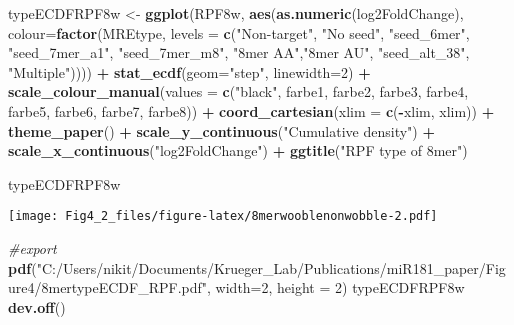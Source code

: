 \documentclass[
]{article}
\newenvironment{Shaded}{\begin{snugshade}}{\end{snugshade}}
\newcommand{\AttributeTok}[1]{\textcolor[rgb]{0.13,0.29,0.53}{#1}}
\newcommand{\CommentTok}[1]{\textcolor[rgb]{0.56,0.35,0.01}{\textit{#1}}}
\newcommand{\DecValTok}[1]{\textcolor[rgb]{0.00,0.00,0.81}{#1}}
\newcommand{\FunctionTok}[1]{\textcolor[rgb]{0.13,0.29,0.53}{\textbf{#1}}}
\newcommand{\NormalTok}[1]{#1}
\newcommand{\OtherTok}[1]{\textcolor[rgb]{0.56,0.35,0.01}{#1}}
\newcommand{\SpecialCharTok}[1]{\textcolor[rgb]{0.81,0.36,0.00}{\textbf{#1}}}
\newcommand{\StringTok}[1]{\textcolor[rgb]{0.31,0.60,0.02}{#1}}
\begin{document}
\begin{Shaded}
\begin{Highlighting}[]
\NormalTok{typeECDFRPF8w }\OtherTok{\textless{}{-}} \FunctionTok{ggplot}\NormalTok{(RPF8w, }\FunctionTok{aes}\NormalTok{(}\FunctionTok{as.numeric}\NormalTok{(log2FoldChange), }
                              \AttributeTok{colour=}\FunctionTok{factor}\NormalTok{(MREtype, }\AttributeTok{levels =} \FunctionTok{c}\NormalTok{(}\StringTok{"Non{-}target"}\NormalTok{, }\StringTok{"No seed"}\NormalTok{, }\StringTok{"seed\_6mer"}\NormalTok{, }\StringTok{"seed\_7mer\_a1"}\NormalTok{, }\StringTok{"seed\_7mer\_m8"}\NormalTok{, }\StringTok{"8mer AA"}\NormalTok{,}\StringTok{"8mer AU"}\NormalTok{, }\StringTok{"seed\_alt\_38"}\NormalTok{, }\StringTok{"Multiple"}\NormalTok{)))) }\SpecialCharTok{+} 
  \FunctionTok{stat\_ecdf}\NormalTok{(}\AttributeTok{geom=}\StringTok{"step"}\NormalTok{, }\AttributeTok{linewidth=}\DecValTok{2}\NormalTok{) }\SpecialCharTok{+}
  \FunctionTok{scale\_colour\_manual}\NormalTok{(}\AttributeTok{values =} \FunctionTok{c}\NormalTok{(}\StringTok{"black"}\NormalTok{, farbe1, farbe2, farbe3, farbe4, farbe5, farbe6, farbe7, farbe8)) }\SpecialCharTok{+}
  \FunctionTok{coord\_cartesian}\NormalTok{(}\AttributeTok{xlim =} \FunctionTok{c}\NormalTok{(}\SpecialCharTok{{-}}\NormalTok{xlim, xlim)) }\SpecialCharTok{+} 
  \FunctionTok{theme\_paper}\NormalTok{() }\SpecialCharTok{+}
  \FunctionTok{scale\_y\_continuous}\NormalTok{(}\StringTok{"Cumulative density"}\NormalTok{) }\SpecialCharTok{+} \FunctionTok{scale\_x\_continuous}\NormalTok{(}\StringTok{"log2FoldChange"}\NormalTok{) }\SpecialCharTok{+}
  \FunctionTok{ggtitle}\NormalTok{(}\StringTok{"RPF type of 8mer"}\NormalTok{)}

\NormalTok{typeECDFRPF8w}
\end{Highlighting}
\end{Shaded}

\texttt{[image: Fig4\_2\_files/figure-latex/8merwooblenonwobble-2.pdf]}

\begin{Shaded}
\begin{Highlighting}[]
\CommentTok{\#export}
\FunctionTok{pdf}\NormalTok{(}\StringTok{"C:/Users/nikit/Documents/Krueger\_Lab/Publications/miR181\_paper/Figure4/8mertypeECDF\_RPF.pdf"}\NormalTok{, }\AttributeTok{width=}\DecValTok{2}\NormalTok{, }\AttributeTok{height =} \DecValTok{2}\NormalTok{)}
\NormalTok{typeECDFRPF8w}
\FunctionTok{dev.off}\NormalTok{()}
\end{Highlighting}
\end{Shaded}
\end{document}
